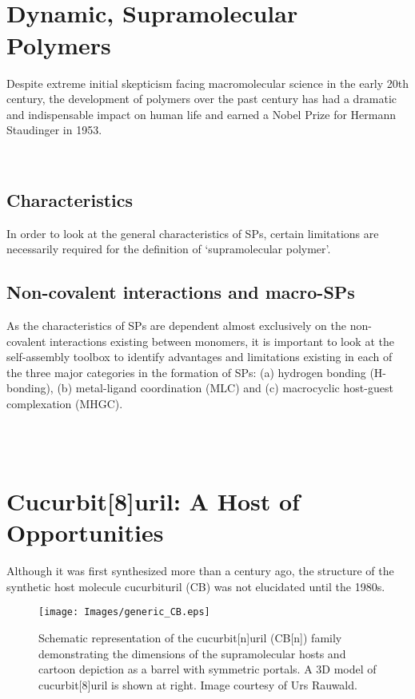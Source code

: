 \documentclass[a4wide,12pt]{report} %
\begin{document}
\\
\\
\section{Dynamic, Supramolecular Polymers}
\noindent
Despite extreme initial skepticism facing macromolecular science in the early 20th century, the development of polymers over the past century has had a dramatic and indispensable impact on human life and earned a Nobel Prize for Hermann Staudinger in 1953.\cite{Staudinger:1953p3048}


\\
\subsection{Characteristics}
\noindent
In order to look at the general characteristics of SPs, certain limitations are necessarily required for the definition of `supramolecular polymer'. 





\subsection{Non-covalent interactions and macro-SPs}
\noindent
As the characteristics of SPs are dependent almost exclusively on the non-covalent interactions existing between monomers, it is important to look at the self-assembly toolbox to identify advantages and limitations existing in each of the three major categories in the formation of SPs: (a) hydrogen bonding (H-bonding), (b) metal-ligand coordination (MLC) and (c) macrocyclic host-guest complexation (MHGC).

\\
\\
\section{Cucurbit[8]uril: A Host of Opportunities}
\noindent
Although it was first synthesized more than a century ago,\cite{Behrend:1905p1004} the structure of the synthetic host molecule cucurbituril (CB) was not elucidated until the 1980s.\cite{Freeman:1981p990}

\vspace{0.25 in}
\begin{figure}[h]
\begin{center}
 \texttt{[image: Images/generic\_CB.eps]}
\vspace{0.1 in}
  \caption{Schematic representation of the cucurbit[n]uril (CB[n]) family demonstrating the dimensions of the supramolecular hosts and cartoon depiction as a barrel with symmetric portals. A 3D model of cucurbit[8]uril is shown at right. Image courtesy of Urs Rauwald.}\label{generic_CB}
\end{center}
\vspace{0.25 in}
\end{figure} 
\end{document}
